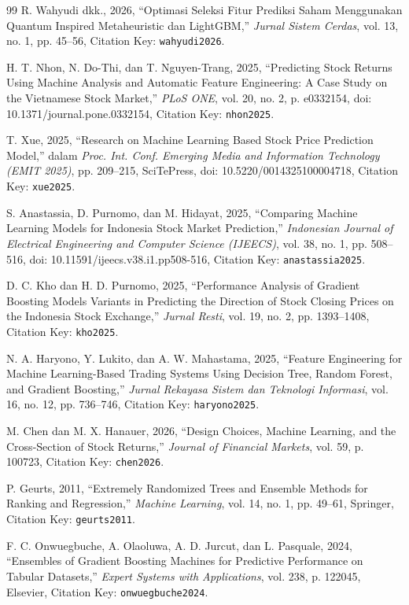\documentclass[10pt,a4paper]{article}
\begin{document}
\begin{thebibliography}{99}
R. Wahyudi dkk., 2026, ``Optimasi Seleksi Fitur Prediksi Saham Menggunakan Quantum Inspired Metaheuristic dan LightGBM,'' \textit{Jurnal Sistem Cerdas}, vol. 13, no. 1, pp. 45--56, Citation Key: \texttt{wahyudi2026}.

H. T. Nhon, N. Do-Thi, dan T. Nguyen-Trang, 2025, ``Predicting Stock Returns Using Machine Analysis and Automatic Feature Engineering: A Case Study on the Vietnamese Stock Market,'' \textit{PLoS ONE}, vol. 20, no. 2, p. e0332154, doi: 10.1371/journal.pone.0332154, Citation Key: \texttt{nhon2025}.

T. Xue, 2025, ``Research on Machine Learning Based Stock Price Prediction Model,'' dalam \textit{Proc. Int. Conf. Emerging Media and Information Technology (EMIT 2025)}, pp. 209--215, SciTePress, doi: 10.5220/0014325100004718, Citation Key: \texttt{xue2025}.

S. Anastassia, D. Purnomo, dan M. Hidayat, 2025, ``Comparing Machine Learning Models for Indonesia Stock Market Prediction,'' \textit{Indonesian Journal of Electrical Engineering and Computer Science (IJEECS)}, vol. 38, no. 1, pp. 508--516, doi: 10.11591/ijeecs.v38.i1.pp508-516, Citation Key: \texttt{anastassia2025}.

D. C. Kho dan H. D. Purnomo, 2025, ``Performance Analysis of Gradient Boosting Models Variants in Predicting the Direction of Stock Closing Prices on the Indonesia Stock Exchange,'' \textit{Jurnal Resti}, vol. 19, no. 2, pp. 1393--1408, Citation Key: \texttt{kho2025}.

N. A. Haryono, Y. Lukito, dan A. W. Mahastama, 2025, ``Feature Engineering for Machine Learning-Based Trading Systems Using Decision Tree, Random Forest, and Gradient Boosting,'' \textit{Jurnal Rekayasa Sistem dan Teknologi Informasi}, vol. 16, no. 12, pp. 736--746, Citation Key: \texttt{haryono2025}.

M. Chen dan M. X. Hanauer, 2026, ``Design Choices, Machine Learning, and the Cross-Section of Stock Returns,'' \textit{Journal of Financial Markets}, vol. 59, p. 100723, Citation Key: \texttt{chen2026}.

P. Geurts, 2011, ``Extremely Randomized Trees and Ensemble Methods for Ranking and Regression,'' \textit{Machine Learning}, vol. 14, no. 1, pp. 49--61, Springer, Citation Key: \texttt{geurts2011}.

F. C. Onwuegbuche, A. Olaoluwa, A. D. Jurcut, dan L. Pasquale, 2024, ``Ensembles of Gradient Boosting Machines for Predictive Performance on Tabular Datasets,'' \textit{Expert Systems with Applications}, vol. 238, p. 122045, Elsevier, Citation Key: \texttt{onwuegbuche2024}.


\end{thebibliography}
\end{document}
